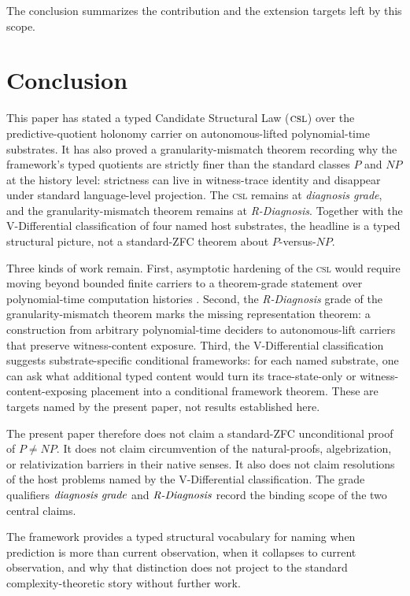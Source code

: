 \documentclass[11pt]{article}
\newcommand{\CSL}{\textsc{csl}}            \newcommand{\CSLcore}{Candidate Structural Law}
\newcommand{\DiagnosisGrade}{\emph{diagnosis grade}}
\newcommand{\RDiagnosis}{\emph{R-Diagnosis}}
\theoremstyle{definition}
\begin{document}
The conclusion summarizes the contribution and the extension targets
left by this scope.
 

\section{Conclusion}
\label{sec:conclusion}

This paper has stated a typed \CSLcore{} (\(\CSL\)) over the
predictive-quotient holonomy carrier on autonomous-lifted
polynomial-time substrates.  It has also proved a
granularity-mismatch theorem recording why the framework's typed
quotients are strictly finer than the standard classes \(P\) and
\(NP\) at the history level: strictness can live in witness-trace
identity and disappear under standard language-level projection.  The
\CSL{} remains at \DiagnosisGrade{}, and the granularity-mismatch
theorem remains at \RDiagnosis{}.  Together with the V-Differential
classification of four named host substrates, the headline is a typed
structural picture, not a standard-ZFC theorem about \(P\)-versus-\(NP\).

Three kinds of work remain.  First, asymptotic hardening of the
\CSL{} would require moving beyond bounded finite carriers to a
theorem-grade statement over polynomial-time computation histories
\citep{AroraBarak2009Complexity,Wigderson2019MathematicsComputation}.
Second, the \RDiagnosis{} grade of the granularity-mismatch theorem
marks the missing representation theorem: a construction from
arbitrary polynomial-time deciders to autonomous-lift carriers that
preserve witness-content exposure.  Third, the V-Differential
classification suggests substrate-specific conditional frameworks: for
each named substrate, one can ask what additional typed content would
turn its trace-state-only or witness-content-exposing placement into a
conditional framework theorem.  These are targets named by the present
paper, not results established here.

The present paper therefore does not claim a standard-ZFC
unconditional proof of \(P\neq NP\).  It does not claim circumvention
of the natural-proofs, algebrization, or relativization barriers in
their native senses.  It also does not claim resolutions of the host
problems named by the V-Differential classification.  The grade
qualifiers \(\DiagnosisGrade{}\) and \(\RDiagnosis{}\) record the
binding scope of the two central claims.

The framework provides a typed structural vocabulary for naming when
prediction is more than current observation, when it collapses to
current observation, and why that distinction does not project to the
standard complexity-theoretic story without further work.
 
\end{document}
